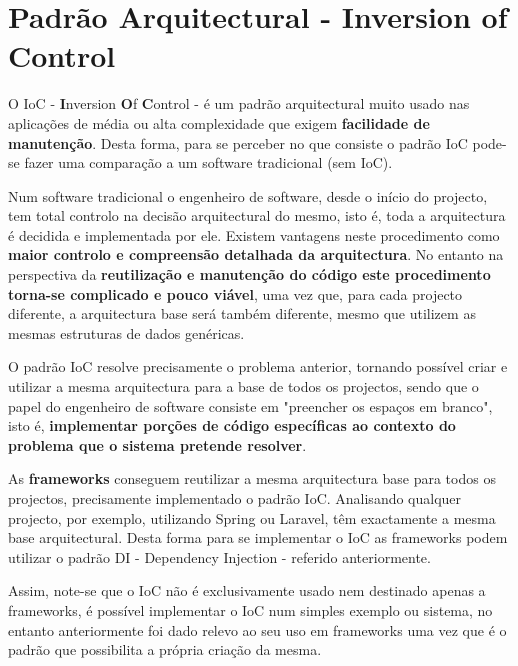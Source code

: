 \section{Padrão Arquitectural - Inversion of Control}
\label{sec:inversion}

\hspace{3mm} O IoC - \textbf{I}nversion \textbf{O}f \textbf{C}ontrol - é um padrão arquitectural muito usado nas aplicações de média ou alta complexidade que exigem \textbf{facilidade de manutenção}. Desta forma, para se perceber no que consiste o padrão IoC pode-se fazer uma comparação a um software tradicional (sem IoC). 

Num software tradicional o engenheiro de software, desde o início do projecto, tem total controlo na decisão arquitectural do mesmo, isto é, toda a arquitectura é decidida e implementada por ele. Existem vantagens neste procedimento como \textbf{maior controlo e compreensão detalhada da arquitectura}. No entanto na perspectiva da \textbf{reutilização e manutenção do código este procedimento torna-se complicado e pouco viável}, uma vez que, para cada projecto diferente, a arquitectura base será também diferente, mesmo que utilizem as mesmas estruturas de dados genéricas.

O padrão IoC resolve precisamente o problema anterior, tornando possível criar e utilizar a mesma arquitectura para a base de todos os projectos, sendo que o papel do engenheiro de software consiste em "preencher os espaços em branco", isto é, \textbf{implementar porções de código específicas ao contexto do problema que o sistema pretende resolver}. 

As \textbf{frameworks} conseguem reutilizar a mesma arquitectura base para todos os projectos, precisamente implementado o padrão IoC. Analisando qualquer projecto, por exemplo, utilizando Spring ou Laravel, têm exactamente a mesma base arquitectural. Desta forma para se implementar o IoC as frameworks podem utilizar o padrão DI - Dependency Injection - referido anteriormente.

Assim, note-se que o IoC não é exclusivamente usado nem destinado apenas a frameworks, é possível implementar o IoC num simples exemplo ou sistema, no entanto anteriormente foi dado relevo ao seu uso em frameworks uma vez que é o padrão que possibilita a própria criação da mesma.